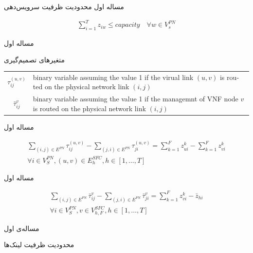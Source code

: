 \documentclass{beamer}
\begin{document}
\begin{persian}
\begin{frame}{مساله اول}
	محدودیت ظرفیت سرویس‌دهی 
	\begin{latin}\begin{align}
		\sum_{i=1}^{T} z_{iw} \le capacity
		\quad
		\forall w \in V_{s}^{PN}
	\end{align}\end{latin}
\end{frame}
\begin{frame}{مساله اول}
	\par
	متغیرهای تصمیم‌گیری
	\begin{latin}\begin{tabular}{c p{10cm}}
		$\tau^{(u,v)}_{ij}$ & binary variable assuming the value 1 if the virual link $(u,v)$ is routed on the physical network link $(i,j)$\\
		$\bar{\tau}^{v}_{ij}$ & binary variable assuming the value 1 if the managemnt of VNF node $v$ is routed on the physical network link $(i,j)$\\
	\end{tabular}\end{latin}
\end{frame}
\begin{frame}{مساله اول}
	\par
	\begin{latin}\begin{align}
		\sum_{(i,j) \in E^{PN}} \tau_{ij}^{(u,v)} - \sum_{(j,i) \in E^{PN}} \tau_{ji}^{(u,v)} = \sum_{k=1}^{F} z_{ui}^{k} - \sum_{k=1}^{F} z_{vi}^{k} \nonumber \\
		\forall i \in V_{S}^{PN}, (u,v) \in E_{h}^{SFC}, h \in [1,\ldots, T]
	\end{align}\end{latin}
\end{frame}
\begin{frame}{مساله اول}
	\par
	\begin{latin}\begin{align}
		\sum_{(i,j) \in E^{PN}} \bar{\tau}_{ij}^{v} - \sum_{(j,i) \in E^{PN}} \bar{\tau}_{ji}^{v} = \sum_{k=1}^{F} z_{vi}^{k} - \bar{z}_{hi} \nonumber \\
		\forall i \in V_{S}^{PN}, v \in V_{h, F}^{SFC}, h \in [1,\ldots, T]
	\end{align}\end{latin}
\end{frame}
\begin{frame}{مساله‌ی اول}
	\par
	محدودیت ظرفیت لینک‌ها

\end{frame}
\end{persian}
\end{document}

